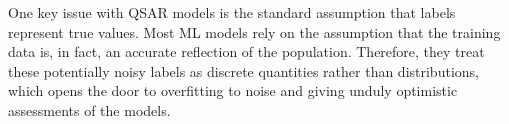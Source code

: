 
One key issue with QSAR models is the standard assumption that labels represent true values. Most ML models rely on the assumption that the training data is, in fact, an accurate reflection of the population. Therefore, they treat these potentially noisy labels as discrete quantities rather than distributions, which opens the door to overfitting to noise and giving unduly optimistic assessments of the models.

